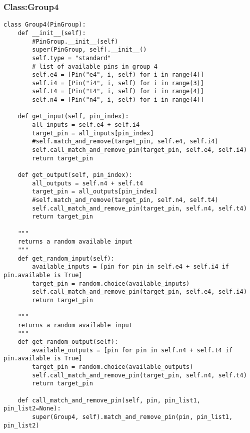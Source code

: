 \documentclass[a4paper]{article}
\begin{document}
\subsubsection{Class:Group4}
\label{sec-4-5-4}
\begin{verbatim}
class Group4(PinGroup):
    def __init__(self):
        #PinGroup.__init__(self)
        super(PinGroup, self).__init__()
        self.type = "standard"
        # list of available pins in group 4
        self.e4 = [Pin("e4", i, self) for i in range(4)]
        self.i4 = [Pin("i4", i, self) for i in range(3)]
        self.t4 = [Pin("t4", i, self) for i in range(4)]
        self.n4 = [Pin("n4", i, self) for i in range(4)]

    def get_input(self, pin_index):
        all_inputs = self.e4 + self.i4
        target_pin = all_inputs[pin_index]
        #self.match_and_remove(target_pin, self.e4, self.i4)
        self.call_match_and_remove_pin(target_pin, self.e4, self.i4)
        return target_pin

    def get_output(self, pin_index):
        all_outputs = self.n4 + self.t4
        target_pin = all_outputs[pin_index]
        #self.match_and_remove(target_pin, self.n4, self.t4)
        self.call_match_and_remove_pin(target_pin, self.n4, self.t4)
        return target_pin

    """
    returns a random available input
    """
    def get_random_input(self):
        available_inputs = [pin for pin in self.e4 + self.i4 if pin.available is True]
        target_pin = random.choice(available_inputs)
        self.call_match_and_remove_pin(target_pin, self.e4, self.i4)
        return target_pin

    """
    returns a random available input
    """
    def get_random_output(self):
        available_outputs = [pin for pin in self.n4 + self.t4 if pin.available is True]
        target_pin = random.choice(available_outputs)
        self.call_match_and_remove_pin(target_pin, self.n4, self.t4)
        return target_pin

    def call_match_and_remove_pin(self, pin, pin_list1, pin_list2=None):
        super(Group4, self).match_and_remove_pin(pin, pin_list1, pin_list2)
\end{verbatim}
\end{document}
